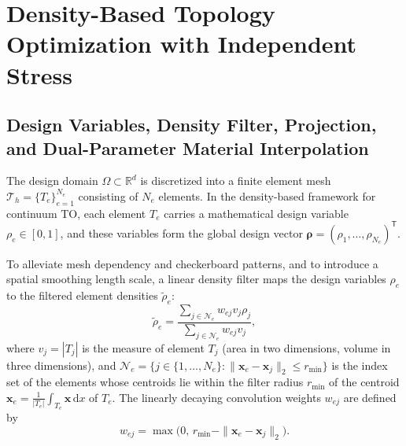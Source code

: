 \section{Density-Based Topology Optimization with Independent Stress}
\label{sec:topopt_formulation}

\subsection{Design Variables, Density Filter, Projection, and Dual-Parameter Material Interpolation}
\label{subsec:material_interpolation}

The design domain $\Omega \subset \mathbb{R}^d$ is discretized into a finite element mesh $\mathcal{T}_h = \{T_e\}_{e=1}^{N_e}$ consisting of $N_e$ elements. In the density-based framework for continuum TO, each element $T_e$ carries a mathematical design variable $\rho_e \in [0, 1]$, and these variables form the global design vector $\boldsymbol{\rho} = (\rho_1, \dots, \rho_{N_e})^{\mathsf T}$.

To alleviate mesh dependency and checkerboard patterns, and to introduce a spatial smoothing length scale, a linear density filter \cite{Bourdin2001,BrunsTortorelli2001} maps the design variables $\rho_e$ to the filtered element densities $\tilde{\rho}_e$:
\begin{equation}
\label{eq:density_filter}
\tilde{\rho}_e = \frac{\sum_{j \in \mathcal{N}_e} w_{ej} v_j \rho_j}{\sum_{j \in \mathcal{N}_e} w_{ej} v_j},
\end{equation}
where $v_j = |T_j|$ is the measure of element $T_j$ (area in two dimensions, volume in three dimensions), and $\mathcal{N}_e = \{ j \in \{1, \dots, N_e\} : \|\boldsymbol{x}_e - \boldsymbol{x}_j\|_2 \le r_{\min} \}$ is the index set of the elements whose centroids lie within the filter radius $r_{\min}$ of the centroid $\boldsymbol{x}_e = \frac{1}{|T_e|}\int_{T_e} \boldsymbol{x} \,\mathrm{d}x$ of $T_e$. The linearly decaying convolution weights $w_{ej}$ are defined by
\begin{equation*}
w_{ej} = \max\bigl(0,\, r_{\min} - \|\boldsymbol{x}_e - \boldsymbol{x}_j\|_2\bigr).
\end{equation*}

